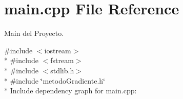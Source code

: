 \section{main.\+cpp File Reference}
\label{main_8cpp}


Main del Proyecto.  


{\ttfamily \#include $<$iostream$>$}\\*
{\ttfamily \#include $<$fstream$>$}\\*
{\ttfamily \#include $<$stdlib.\+h$>$}\\*
{\ttfamily \#include \char`\"{}metodo\+Gradiente.\+h\char`\"{}}\\*
Include dependency graph for main.\+cpp\+:
